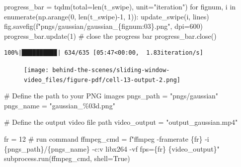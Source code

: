 \documentclass[
  letterpaper,
  DIV=11,
  numbers=noendperiod,
  oneside]{scrreprt}
\newenvironment{Shaded}{\begin{snugshade}}{\end{snugshade}}
\newcommand{\BuiltInTok}[1]{\textcolor[rgb]{0.00,0.23,0.31}{#1}}
\newcommand{\CommentTok}[1]{\textcolor[rgb]{0.37,0.37,0.37}{#1}}
\newcommand{\ControlFlowTok}[1]{\textcolor[rgb]{0.00,0.23,0.31}{#1}}
\newcommand{\DecValTok}[1]{\textcolor[rgb]{0.68,0.00,0.00}{#1}}
\newcommand{\KeywordTok}[1]{\textcolor[rgb]{0.00,0.23,0.31}{#1}}
\newcommand{\NormalTok}[1]{\textcolor[rgb]{0.00,0.23,0.31}{#1}}
\newcommand{\OperatorTok}[1]{\textcolor[rgb]{0.37,0.37,0.37}{#1}}
\newcommand{\SpecialCharTok}[1]{\textcolor[rgb]{0.37,0.37,0.37}{#1}}
\newcommand{\SpecialStringTok}[1]{\textcolor[rgb]{0.13,0.47,0.30}{#1}}
\newcommand{\StringTok}[1]{\textcolor[rgb]{0.13,0.47,0.30}{#1}}
\newcommand{\VariableTok}[1]{\textcolor[rgb]{0.07,0.07,0.07}{#1}}
\begin{document}
\begin{Shaded}
\begin{Highlighting}[]
\NormalTok{progress\_bar }\OperatorTok{=}\NormalTok{ tqdm(total}\OperatorTok{=}\BuiltInTok{len}\NormalTok{(t\_swipe), unit}\OperatorTok{=}\StringTok{"iteration"}\NormalTok{)}
\ControlFlowTok{for}\NormalTok{ fignum, i }\KeywordTok{in} \BuiltInTok{enumerate}\NormalTok{(np.arange(}\DecValTok{0}\NormalTok{, }\BuiltInTok{len}\NormalTok{(t\_swipe)}\OperatorTok{{-}}\DecValTok{1}\NormalTok{, }\DecValTok{1}\NormalTok{)):}
\NormalTok{    update\_swipe(i, lines)}
\NormalTok{    fig.savefig(}\SpecialStringTok{f"pngs/gaussian/gaussian\_}\SpecialCharTok{\{}\NormalTok{fignum}\SpecialCharTok{:03\}}\SpecialStringTok{.png"}\NormalTok{, dpi}\OperatorTok{=}\DecValTok{600}\NormalTok{)}
\NormalTok{    progress\_bar.update(}\DecValTok{1}\NormalTok{)}
\CommentTok{\# close the progress bar}
\NormalTok{progress\_bar.close()}
\end{Highlighting}
\end{Shaded}

\begin{verbatim}
100%|█████████▉| 634/635 [05:47<00:00,  1.83iteration/s]
\end{verbatim}

\begin{figure}[H]

{\centering \texttt{[image: behind-the-scenes/sliding-window-video\_files/figure-pdf/cell-13-output-2.png]}

}

\end{figure}

\begin{Shaded}
\begin{Highlighting}[]
\CommentTok{\# Define the path to your PNG images}
\NormalTok{pngs\_path }\OperatorTok{=} \StringTok{"pngs/gaussian"}
\NormalTok{pngs\_name }\OperatorTok{=} \StringTok{"gaussian\_}\SpecialCharTok{\%03d}\StringTok{.png"}

\CommentTok{\# Define the output video file path}
\NormalTok{video\_output }\OperatorTok{=} \StringTok{"output\_gaussian.mp4"}

\NormalTok{fr }\OperatorTok{=} \DecValTok{12}
\CommentTok{\# run command}
\NormalTok{ffmpeg\_cmd }\OperatorTok{=} \SpecialStringTok{f"ffmpeg {-}framerate }\SpecialCharTok{\{}\NormalTok{fr}\SpecialCharTok{\}}\SpecialStringTok{ {-}i }\SpecialCharTok{\{}\NormalTok{pngs\_path}\SpecialCharTok{\}}\SpecialStringTok{/}\SpecialCharTok{\{}\NormalTok{pngs\_name}\SpecialCharTok{\}}\SpecialStringTok{ {-}c:v libx264 {-}vf fps=}\SpecialCharTok{\{}\NormalTok{fr}\SpecialCharTok{\}}\SpecialStringTok{ }\SpecialCharTok{\{}\NormalTok{video\_output}\SpecialCharTok{\}}\SpecialStringTok{"}
\NormalTok{subprocess.run(ffmpeg\_cmd, shell}\OperatorTok{=}\VariableTok{True}\NormalTok{)}
\end{Highlighting}
\end{Shaded}
\end{document}
